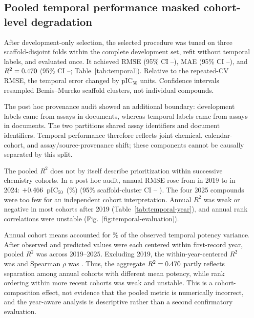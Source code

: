 \documentclass[11pt]{article}
\begin{document}


\subsection{Pooled temporal performance masked cohort-level degradation}

After development-only selection, the selected procedure was tuned on three
scaffold-disjoint folds within the complete development set, refit without
temporal labels, and evaluated once. It achieved RMSE \TemporalRMSE{} (95\% CI
\TemporalRMSELower{}--\TemporalRMSEUpper{}), MAE \TemporalMAE{} (95\% CI
\TemporalMAELower{}--\TemporalMAEUpper{}), and $R^2=0.470{}$ (95\% CI
\TemporalRtwoLower{}--\TemporalRtwoUpper{}; Table~\ref{tab:temporal}). Relative
to the repeated-CV RMSE, the temporal error changed by
\TemporalGeneralizationGap{} pIC$_{50}$ units. Confidence intervals resampled
Bemis--Murcko scaffold clusters, not individual compounds.

The post hoc provenance audit showed an additional boundary: development labels
came from \DevelopmentAssayCount{} assays in \DevelopmentDocumentCount{}
documents, whereas temporal labels came from \TemporalAssayCount{} assays in
\TemporalDocumentCount{} documents. The two partitions shared
\AssayPartitionOverlapCount{} assay identifiers and
\DocumentPartitionOverlapCount{} document identifiers. Temporal performance
therefore reflects joint chemical, calendar-cohort, and assay/source-provenance
shift; these components cannot be causally separated by this split.



\enlargethispage{2\baselineskip}
The pooled $R^2$ does not by itself describe prioritization within successive
chemistry cohorts. In a post hoc audit, annual RMSE rose from
\TemporalRMSETwentyNineteen{} in 2019 to
\TemporalRMSETwentyTwentyFour{} in 2024:
\mbox{$+0.466{}$ pIC$_{50}$ (\TemporalRMSEIncreasePercent{}\%)}
(95\% scaffold-cluster CI \TemporalRMSEIncreaseScaffoldLower{}--
\TemporalRMSEIncreaseScaffoldUpper{}). The four
2025 compounds were too few for an independent cohort interpretation. Annual
$R^2$ was weak or negative in most cohorts after 2019
(Table~\ref{tab:temporal-year}), and annual rank correlations were unstable
(Fig.~\ref{fig:temporal-evaluation}).



Annual cohort means accounted for \BetweenYearVariancePercent{}\% of the observed
temporal potency variance. After observed and predicted values were each centered
within first-record year, pooled $R^2$ was \WithinYearCenteredRtwoAll{} across
2019--2025. Excluding 2019, the within-year-centered $R^2$ was
\LaterCohortCenteredRtwo{} and Spearman $\rho$ was
\LaterCohortCenteredSpearman{}. Thus, the aggregate $R^2=0.470{}$ partly
reflects separation among annual cohorts with different mean potency, while
rank ordering within more recent cohorts was weak and unstable. This is a
cohort-composition effect, not evidence that the pooled metric is numerically
incorrect, and the year-aware analysis is descriptive rather than a second
confirmatory evaluation.
\end{document}
